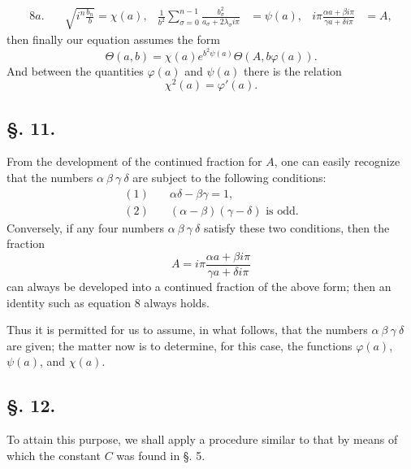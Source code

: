 \documentclass[10pt]{article}
\begin{document}
\begin{align*}
8a.\quad&\sqrt{i^{n}\frac{b_n}{b}}=\chi(a),&
\frac{1}{b^{2}}\sum_{\sigma=0}^{n-1}\frac{b_\sigma^{2}}{a_\sigma+2\lambda_\sigma i\pi}&=\psi(a),&
 i\pi\frac{\alpha a+\beta i\pi}{\gamma a+\delta i\pi}&=A,
\end{align*}
then finally our equation assumes the form
\begin{equation*}
\Theta(a,b)=\chi(a)e^{b^{2}\psi(a)}\Theta(A,b\varphi(a)).
\tag{8b.}
\end{equation*}
And between the quantities \(\varphi(a)\) and \(\psi(a)\) there is the relation
\begin{equation*}
\chi^{2}(a)=\varphi'(a).
\tag{9.}
\end{equation*}

\subsection*{\S. 11.}
From the development of the continued fraction for \(A\), one can easily recognize that the numbers \(\alpha\ \beta\ \gamma\ \delta\) are subject to the following conditions:
\begin{align*}
(1)\quad&\alpha\delta-\beta\gamma=1,\\
(2)\quad&(\alpha-\beta)(\gamma-\delta)\text{ is odd.}
\end{align*}
Conversely, if any four numbers \(\alpha\ \beta\ \gamma\ \delta\) satisfy these two conditions, then the fraction
\[
A=i\pi\frac{\alpha a+\beta i\pi}{\gamma a+\delta i\pi}
\]
can always be developed into a continued fraction of the above form; then an identity such as equation 8 always holds.

Thus it is permitted for us to assume, in what follows, that the numbers \(\alpha\ \beta\ \gamma\ \delta\) are given; the matter now is to determine, for this case, the functions \(\varphi(a)\), \(\psi(a)\), and \(\chi(a)\).

\subsection*{\S. 12.}
To attain this purpose, we shall apply a procedure similar to that by means of which the constant \(C\) was found in \S. 5.
\end{document}
